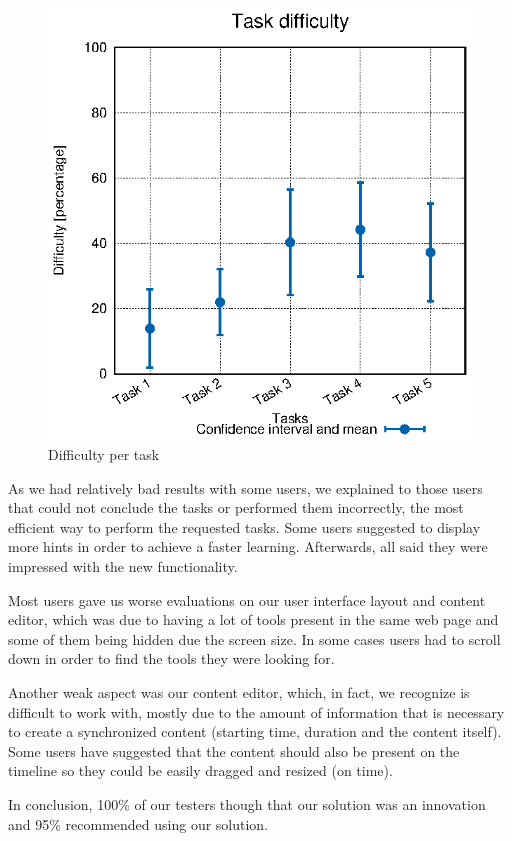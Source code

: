 \documentclass[10pt,conference]{IEEEtran}
\begin{document}
\begin{figure}
  \centering
    \includegraphics[width=0.75\linewidth]{stats/user_diffs.eps}
  \caption{Difficulty per task}
  \label{fig:user_diffs}
\end{figure}


As we had relatively bad results with some users, we explained to those users that could not conclude the tasks or performed them incorrectly, the most efficient way to perform the requested tasks.
Some users suggested to display more hints in order to achieve a faster learning.
Afterwards, all said they were impressed with the new functionality.

Most users gave us worse evaluations on our user interface layout and content editor, which was due to having a lot of tools present in the same web page and some of them being hidden due the screen size.
In some cases users had to scroll down in order to find the tools they were looking for. 

Another weak aspect was our content editor, which, in fact, we recognize is difficult to work with, mostly due to the amount of information that is necessary to create a synchronized content (starting time, duration and the content itself).
Some users have suggested that the content should also be present on the timeline so they could be easily dragged and resized (on time).

In conclusion, 100\% of our testers though that our solution was an innovation and 95\% recommended using our solution.
\end{document}
